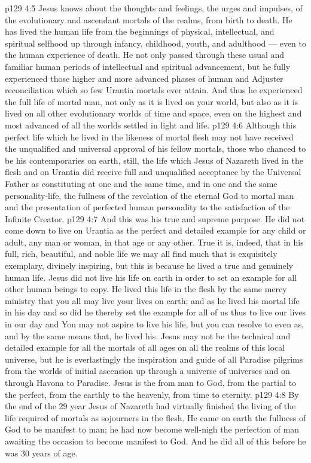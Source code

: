 \vs p129 4:5 Jesus knows about the thoughts and feelings, the urges and impulses, of the evolutionary and ascendant mortals of the realms, from birth to death. He has lived the human life from the beginnings of physical, intellectual, and spiritual selfhood up through infancy, childhood, youth, and adulthood --- even to the human experience of death. He not only passed through these usual and familiar human periods of intellectual and spiritual advancement, but he  fully experienced those higher and more advanced phases of human and Adjuster reconciliation which so few Urantia mortals ever attain. And thus he experienced the full life of mortal man, not only as it is lived on your world, but also as it is lived on all other evolutionary worlds of time and space, even on the highest and most advanced of all the worlds settled in light and life.
\vs p129 4:6 Although this perfect life which he lived in the likeness of mortal flesh may not have received the unqualified and universal approval of his fellow mortals, those who chanced to be his contemporaries on earth, still, the life which Jesus of Nazareth lived in the flesh and on Urantia did receive full and unqualified acceptance by the Universal Father as constituting at one and the same time, and in one and the same personality\hyp{}life, the fullness of the revelation of the eternal God to mortal man and the presentation of perfected human personality to the satisfaction of the Infinite Creator.
\vs p129 4:7 And this was his true and supreme purpose. He did not come down to live on Urantia as the perfect and detailed example for any child or adult, any man or woman, in that age or any other. True it is, indeed, that in his full, rich, beautiful, and noble life we may all find much that is exquisitely exemplary, divinely inspiring, but this is because he lived a true and genuinely human life. Jesus did not live his life on earth in order to set an example for all other human beings to copy. He lived this life in the flesh by the same mercy ministry that you all may live your lives on earth; and as he lived his mortal life in his day and  so did he thereby set the example for all of us thus to live our lives in our day and  You may not aspire to live his life, but you can resolve to  even as, and by the same means that, he lived his. Jesus may not be the technical and detailed example for all the mortals of all ages on all the realms of this local universe, but he is everlastingly the inspiration and guide of all Paradise pilgrims from the worlds of initial ascension up through a universe of universes and on through Havona to Paradise. Jesus is the  from man to God, from the partial to the perfect, from the earthly to the heavenly, from time to eternity.
\vs p129 4:8 \pc By the end of the 29 year Jesus of Nazareth had virtually finished the living of the life required of mortals as sojourners in the flesh. He came on earth the fullness of God to be manifest to man; he had now become well\hyp{}nigh the perfection of man awaiting the occasion to become manifest to God. And he did all of this before he was 30 years of age.
\quizlink
